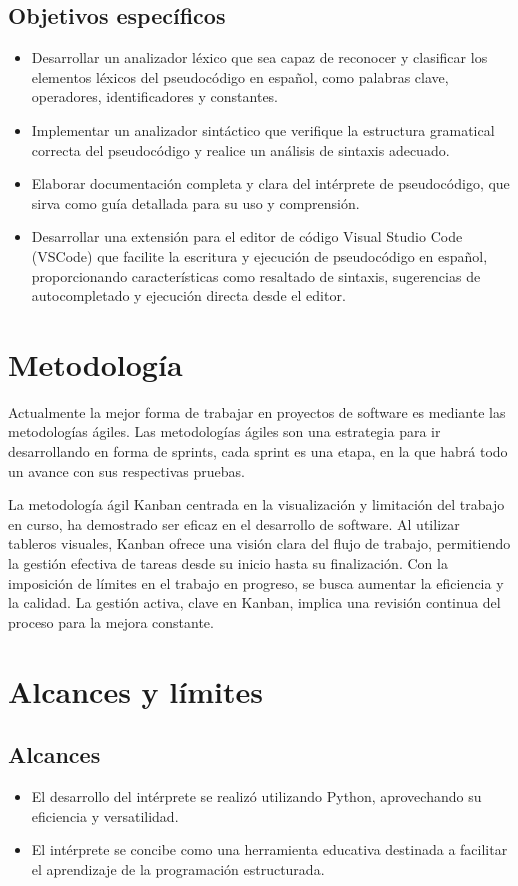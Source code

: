 \subsection{Objetivos específicos}
\begin{itemize}
  \item Desarrollar un analizador léxico que sea capaz de reconocer y clasificar los elementos léxicos del pseudocódigo en español, como palabras clave, operadores, identificadores y constantes.
  \item Implementar un analizador sintáctico que verifique la estructura gramatical correcta del pseudocódigo y realice un análisis de sintaxis adecuado.
  \item Elaborar documentación completa y clara del intérprete de pseudocódigo, que sirva como guía detallada para su uso y comprensión.
  \item Desarrollar una extensión para el editor de código Visual Studio Code (VSCode) que facilite la escritura y ejecución de pseudocódigo en español, proporcionando características como resaltado de sintaxis, sugerencias de autocompletado y ejecución directa desde el editor.
\end{itemize}

\section{Metodología}
Actualmente la mejor forma de trabajar en proyectos de software es mediante las metodologías ágiles. Las metodologías ágiles son una estrategia para ir desarrollando en forma de sprints, cada sprint es una etapa, en la que habrá todo un avance con sus respectivas pruebas.

La metodología ágil Kanban centrada en la visualización y limitación del trabajo en curso, ha demostrado ser eficaz en el desarrollo de software. Al utilizar tableros visuales, Kanban ofrece una visión clara del flujo de trabajo, permitiendo la gestión efectiva de tareas desde su inicio hasta su finalización. Con la imposición de límites en el trabajo en progreso, se busca aumentar la eficiencia y la calidad. La gestión activa, clave en Kanban, implica una revisión continua del proceso para la mejora constante.

\section{Alcances y límites}
\subsection{Alcances}
\begin{itemize}
  \item El desarrollo del intérprete se realizó utilizando Python, aprovechando su eficiencia y versatilidad.
  \item El intérprete se concibe como una herramienta educativa destinada a facilitar el aprendizaje de la programación estructurada.
\end{itemize}

